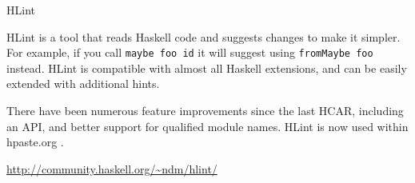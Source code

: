 \begin{hcarentry}[updated]{HLint}
\label{HLint}
\makeheader

HLint is a tool that reads Haskell code and suggests changes to make it simpler.
For example, if you call \texttt{maybe foo id} it will suggest using \texttt{fromMaybe foo} instead.
HLint is compatible with almost all Haskell extensions, and can be easily extended with additional hints.

There have been numerous feature improvements since the last HCAR, including an API, and better support
for qualified module names. HLint is now used within hpaste.org%
.

\FurtherReading
\url{http://community.haskell.org/~ndm/hlint/}
\end{hcarentry}
